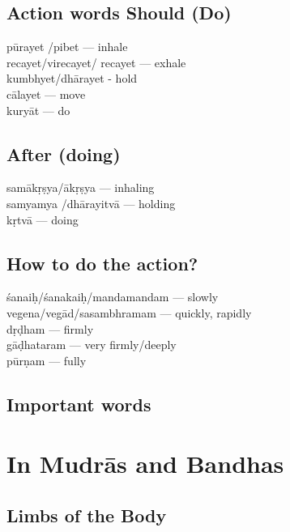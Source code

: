 \subsection*{Action words Should (Do)}

\begin{multicols}{2}
pūrayet /pibet --- inhale\\
recayet/virecayet/ recayet --- exhale \\
kumbhyet/dhārayet - hold\\
cālayet --- move\\
kuryāt --- do
\end{multicols}

\subsection*{After (doing)}

\begin{multicols}{2}
samākṛṣya/ākṛṣya --- inhaling \\
samyamya /dhārayitvā  --- holding\\
kṛtvā --- doing
\end{multicols}

\subsection*{How to do the action?}

\begin{multicols}{2}
śanaiḥ/śanakaiḥ/mandamandam --- slowly\\
vegena/vegād/sasambhramam --- quickly, rapidly\\
dṛḍham --- firmly\\
gāḍhataram --- very firmly/deeply\\
pūrṇam --- fully
\end{multicols}

\subsection*{Important words}

\section*{In Mudrās and Bandhas}

\subsection*{Limbs of the Body}


